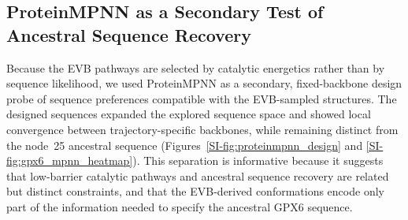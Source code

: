 \subsection{ProteinMPNN as a Secondary Test of Ancestral Sequence Recovery}

Because the EVB pathways are selected by catalytic energetics rather than by sequence likelihood, we used ProteinMPNN as a secondary, fixed-backbone design probe of sequence preferences compatible with the EVB-sampled structures. The designed sequences expanded the explored sequence space and showed local convergence between trajectory-specific backbones, while remaining distinct from the node~25 ancestral sequence (Figures~\ref{SI-fig:proteinmpnn_design} and \ref{SI-fig:gpx6_mpnn_heatmap}). This separation is informative because it suggests that low-barrier catalytic pathways and ancestral sequence recovery are related but distinct constraints, and that the EVB-derived conformations encode only part of the information needed to specify the ancestral GPX6 sequence.
